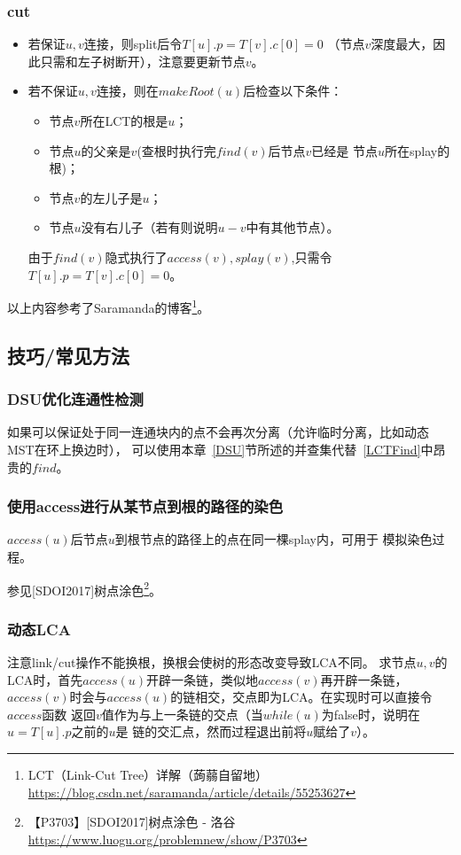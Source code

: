 \subsubsection{cut}

\begin{itemize}
    \item 若保证$u,v$连接，则split后令$T[u].p=T[v].c[0]=0$
    （节点$v$深度最大，因此只需和左子树断开），注意要更新节点$v$。
    \item 若不保证$u,v$连接，则在$makeRoot(u)$后检查以下条件：
    \begin{itemize}
        \item 节点$v$所在LCT的根是$u$；
        \item 节点$u$的父亲是$v$(查根时执行完$find(v)$后节点$v$已经是
        节点$u$所在splay的根)；
        \item 节点$v$的左儿子是$u$；
        \item 节点$u$没有右儿子（若有则说明$u-v$中有其他节点）。
    \end{itemize}
    由于$find(v)$隐式执行了$access(v),splay(v)$,只需令
    $T[u].p=T[v].c[0]=0$。
\end{itemize}

以上内容参考了Saramanda的博客\footnote{
    LCT（Link-Cut Tree）详解（蒟蒻自留地）
    \url{https://blog.csdn.net/saramanda/article/details/55253627}}。

\subsection{技巧/常见方法}
\subsubsection{DSU优化连通性检测}
如果可以保证处于同一连通块内的点不会再次分离（允许临时分离，比如动态MST在环上换边时），
可以使用本章~\ref{DSU}节所述的并查集代替~\ref{LCTFind}中昂贵的$find$。
\subsubsection{使用access进行从某节点到根的路径的染色}
$access(u)$后节点$u$到根节点的路径上的点在同一棵splay内，可用于
模拟染色过程。

参见[SDOI2017]树点涂色\footnote{【P3703】[SDOI2017]树点涂色 - 洛谷
    \url{https://www.luogu.org/problemnew/show/P3703}}。
\subsubsection{动态LCA}
注意link/cut操作不能换根，换根会使树的形态改变导致LCA不同。
求节点$u,v$的LCA时，首先$access(u)$开辟一条链，类似地$access(v)$再开辟一条链，
$access(v)$时会与$access(u)$的链相交，交点即为LCA。在实现时可以直接令$access$函数
返回$v$值作为与上一条链的交点（当$while(u)$为false时，说明在$u=T[u].p$之前的$u$是
链的交汇点，然而过程退出前将$u$赋给了$v$）。

